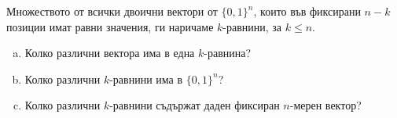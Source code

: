 \begin{problem}
  Множеството от всички двоични вектори от $\{0,1\}^{n}$, които във фиксирани $n-k$ позиции имат равни значения,
  ги наричаме $k$-равнини, за $k\leq n$.
  \begin{enumerate}[a)]
  \item
    Колко различни вектора има в една $k$-равнина?
  \item
    Колко различни $k$-равнини има в $\{0,1\}^{n}$?
  \item
    Колко различни $k$-равнини съдържат даден фиксиран $n$-мерен вектор?
  \end{enumerate}
\end{problem}


